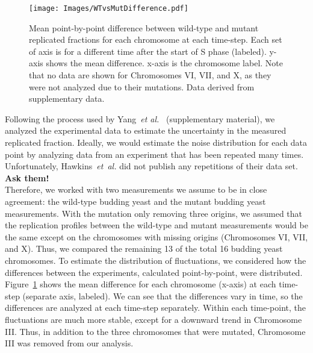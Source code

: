 		\begin{figure}[tbh]
			\begin{center}
				\texttt{[image: Images/WTvsMutDifference.pdf]}
			\end{center}
				\caption[Estimating Experimental Noise A]{\label{fig:MeanDifference} Mean point-by-point difference between wild-type and mutant replicated fractions for each chromosome at each time-step.
					Each set of axis is for a different time after the start of S phase (labeled).
					y-axis shows the mean difference.
					x-axis is the chromosome label.
					Note that no data are shown for Chromosomes VI, VII, and X, as they were not analyzed due to their mutations.
					Data derived from~\cite{StochasticTermination} supplementary data.
				}
		\end{figure}
		
		Following the process used by Yang~\emph{et al.}~\cite{ScottsPaper} (supplementary material), we analyzed the experimental data to estimate the uncertainty in the measured replicated fraction.
		Ideally, we would estimate the noise distribution for each data point by analyzing data from an experiment that has been repeated many times.
		Unfortunately, Hawkins~\emph{et~al.} did not publish any repetitions of their data set.\\
		\textbf{Ask them!}\\
		Therefore, we worked with two measurements we assume to be in close agreement: the wild-type budding yeast and the mutant budding yeast measurements.
		With the mutation only removing three origins, we assumed that the replication profiles between the wild-type and mutant measurements would be the same except on the chromosomes with missing origins (Chromosomes VI, VII, and X).
		Thus, we compared the remaining 13 of the total 16 budding yeast chromosomes.
		To estimate the distribution of fluctuations, we considered how the differences between the experiments, calculated point-by-point, were distributed.
		Figure~\ref{fig:MeanDifference} shows the mean difference for each chromosome (x-axis) at each time-step (separate axis, labeled).
		We can see that the differences vary in time, so the differences are analyzed at each time-step separately.
		Within each time-point, the fluctuations are much more stable, except for a downward trend in Chromosome III.
		Thus, in addition to the three chromosomes that were mutated, Chromosome III was removed from our analysis.
		
